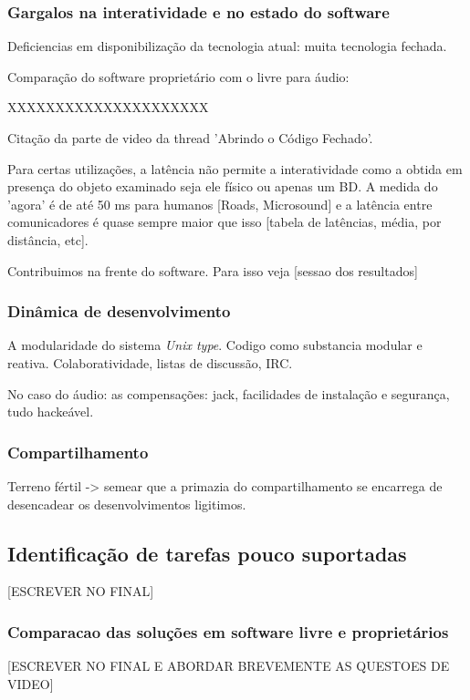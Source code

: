 	  \subsubsection{Gargalos na interatividade e no estado do software}
	  \label{sec:gargalos}
	  Deficiencias em disponibilização da tecnologia atual: muita
	  tecnologia fechada.

	  Comparação do software proprietário com o livre para áudio:

	  XXXXXXXXXXXXXXXXXXXXX

	  Citação da parte de video da thread 'Abrindo o Código Fechado'.

	  Para certas utilizações, a latência não permite a interatividade como 
	  a obtida em presença do objeto examinado seja ele físico ou apenas um BD.
	  A medida do 'agora' é de até 50 ms para humanos [Roads, Microsound] e a latência entre comunicadores é
	  quase sempre maior que isso [tabela de latências, média, por distância, etc].

	  Contribuimos na frente do software. Para isso veja [sessao dos resultados]


	  \subsubsection{Dinâmica de desenvolvimento}
	  \label{sec:din_dev}
	  A modularidade do sistema \emph{Unix type}. Codigo como substancia modular
	  e reativa. Colaboratividade, listas de discussão, IRC.

	  No caso do áudio: as compensações: jack,
	  facilidades de instalação e segurança, tudo hackeável.

	  \subsubsection{Compartilhamento}
	  \label{sec:comp_tec}
	  Terreno fértil -> semear que a primazia do compartilhamento se encarrega de
	  desencadear os desenvolvimentos ligitimos.

      \subsection{Identificação de tarefas pouco suportadas}
      \label{sec:tarefas_n_sup}
  [ESCREVER NO FINAL]

	  \subsubsection{Comparacao das soluções em software livre e proprietários}
	  \label{sec:sl_prop}
      [ESCREVER NO FINAL E ABORDAR BREVEMENTE AS QUESTOES DE VIDEO]



